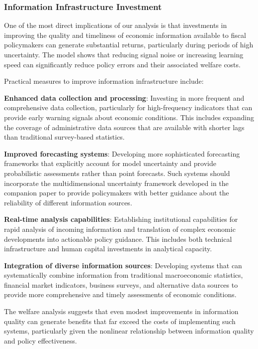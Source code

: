 \documentclass[5p,authoryear]{elsarticle}
\begin{document}
\subsubsection{Information Infrastructure Investment}

One of the most direct implications of our analysis is that investments in improving the quality and timeliness of economic information available to fiscal policymakers can generate substantial returns, particularly during periods of high uncertainty. The model shows that reducing signal noise or increasing learning speed can significantly reduce policy errors and their associated welfare costs.

Practical measures to improve information infrastructure include:

\textbf{Enhanced data collection and processing}: Investing in more frequent and comprehensive data collection, particularly for high-frequency indicators that can provide early warning signals about economic conditions. This includes expanding the coverage of administrative data sources that are available with shorter lags than traditional survey-based statistics.

\textbf{Improved forecasting systems}: Developing more sophisticated forecasting frameworks that explicitly account for model uncertainty and provide probabilistic assessments rather than point forecasts. Such systems should incorporate the multidimensional uncertainty framework developed in the companion paper to provide policymakers with better guidance about the reliability of different information sources.

\textbf{Real-time analysis capabilities}: Establishing institutional capabilities for rapid analysis of incoming information and translation of complex economic developments into actionable policy guidance. This includes both technical infrastructure and human capital investments in analytical capacity.

\textbf{Integration of diverse information sources}: Developing systems that can systematically combine information from traditional macroeconomic statistics, financial market indicators, business surveys, and alternative data sources to provide more comprehensive and timely assessments of economic conditions.

The welfare analysis suggests that even modest improvements in information quality can generate benefits that far exceed the costs of implementing such systems, particularly given the nonlinear relationship between information quality and policy effectiveness.
\end{document}
